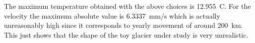 The maximum temperature obtained with the above choices is 12.955~C. 
For the velocity the maximum absolute value is 6.3337~mm/s which is actually unreasonably high since it 
corresponds to yearly movement of around 200~km. This just shows that the shape of the toy glacier 
under study is very unrealistic. 

\hfill
\mbox{}







